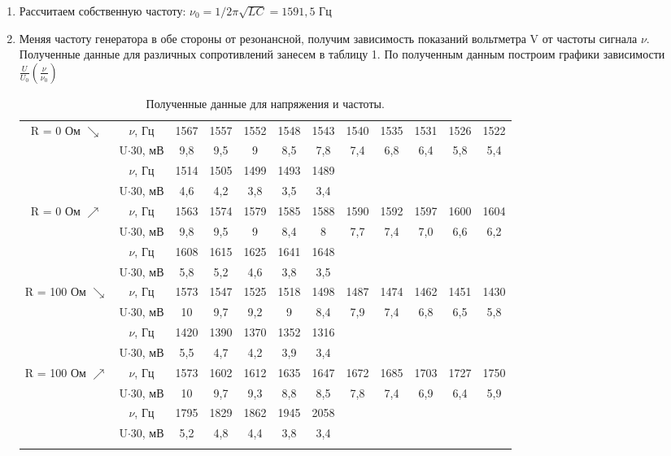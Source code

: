 \documentclass[a4paper, 12pt]{article}%
\begin{document}
	\begin{enumerate}
		
		\item Рассчитаем собственную частоту: $\nu_0 = 1 / 2 \pi \sqrt{LC} =  1591,5$ Гц
	
		\item Меняя частоту генератора в обе стороны от резонансной, получим зависимость показаний вольтметра V от частоты
		сигнала $\nu$. Полученные данные для различных сопротивлений занесем в таблицу 1. По полученным данным построим графики зависимости $\frac{U}{U_0}(\frac{\nu}{\nu_0})$
		
		\begin{longtable} {|c|c|c|c|c|c|c|c|c|c|c|c|}
			\hline
			\multirow{4}{*}{R = 0 Ом $\searrow$}& $\nu$, Гц & 1567 & 1557 & 1552 & 1548 & 1543 & 1540 & 1535 & 1531 & 1526 & 1522  \\ \cline{2-12}
			&U$\cdot 30$, мВ& 9,8 & 9,5 & 9 & 8,5 & 7,8 & 7,4 & 6,8 & 6,4 & 5,8  & 5,4  \\ \cline{2-12}
			
			& $\nu$, Гц &  1514 & 1505 & 1499 & 1493& 1489&&&&&\\ \cline{2-12}
		   	&U$\cdot 30$, мВ&  4,6 & 4,2& 3,8& 3,5 & 3,4 &&&&& \\ \hline
				 
			\multirow{4}{*}{R = 0 Ом $\nearrow$}& $\nu$, Гц & 1563 & 1574 & 1579 & 1585 & 1588 & 1590 & 1592 & 1597 & 1600 & 1604 \\ \cline{2-12}
			&U$\cdot 30$, мВ& 9,8 & 9,5 & 9 & 8,4 & 8 & 7,7 & 7,4 & 7,0 & 6,6  & 6,2  \\ \cline{2-12}
		
			& $\nu$, Гц  & 1608 & 1615 & 1625 & 1641& 1648&&&&& \\ \cline{2-12}
			&U$\cdot 30$, мВ& 5,8 & 5,2& 4,6& 3,8 & 3,5 &&&&&\\ \hline
			
			
			\hline
			
			\multirow{4}{*}{R = 100 Ом $\searrow$}& $\nu$, Гц &1573& 1547 & 1525 & 1518 & 1498 & 1487 & 1474 & 1462 & 1451 & 1430   \\ \cline{2-12}
			&U$\cdot 30$, мВ&10& 9,7 & 9,2 & 9 & 8,4 & 7,9 & 7,4 & 6,8 & 6,5 & 5,8   \\ \cline{2-12}
			& $\nu$, Гц & 1420& 1390 & 1370 & 1352 & 1316&&&&&\\ \cline{2-12}
			&U$\cdot 30$, мВ& 5,5 & 4,7 & 4,2& 3,9 & 3,4 &&&&& \\ \hline
			
			\multirow{4}{*}{R = 100 Ом $\nearrow$ }& $\nu$, Гц &1573& 1602 & 1612 & 1635 & 1647 & 1672 & 1685 & 1703 & 1727 & 1750   \\ \cline{2-12}
			&U$\cdot 30$, мВ&10& 9,7 & 9,3 & 8,8 & 8,5 & 7,8 & 7,4 & 6,9 & 6,4 & 5,9   \\ \cline{2-12}
			& $\nu$, Гц & 1795& 1829 & 1862 & 1945 & 2058&&&&&\\ \cline{2-12}
			&U$\cdot 30$, мВ& 5,2 & 4,8 & 4,4& 3,8 & 3,4 &&&&& \\ \hline
			\caption{Полученные данные для напряжения и частоты.}
			

\end{longtable}
\end{enumerate}
\end{document}
